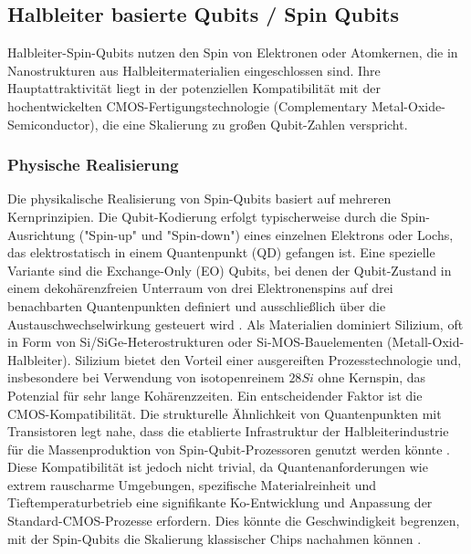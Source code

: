 \subsection{Halbleiter basierte Qubits / Spin Qubits}
Halbleiter-Spin-Qubits nutzen den Spin von Elektronen oder Atomkernen, die in Nanostrukturen aus Halbleitermaterialien eingeschlossen sind. Ihre Hauptattraktivität liegt in der potenziellen Kompatibilität mit der hochentwickelten CMOS-Fertigungstechnologie (Complementary Metal-Oxide-Semiconductor), die eine Skalierung zu großen Qubit-Zahlen verspricht.

\subsubsection{Physische Realisierung}
Die physikalische Realisierung von Spin-Qubits basiert auf mehreren Kernprinzipien. Die Qubit-Kodierung erfolgt typischerweise durch die Spin-Ausrichtung ("Spin-up" und "Spin-down") eines einzelnen Elektrons oder Lochs, das elektrostatisch in einem Quantenpunkt (QD) gefangen ist. Eine spezielle Variante sind die Exchange-Only (EO) Qubits, bei denen der Qubit-Zustand in einem dekohärenzfreien Unterraum von drei Elektronenspins auf drei benachbarten Quantenpunkten definiert und ausschließlich über die Austauschwechselwirkung gesteuert wird \cite{chadwickShortTwoqubitPulse2025}. Als
Materialien dominiert Silizium, oft in Form von Si/SiGe-Heterostrukturen oder Si-MOS-Bauelementen (Metall-Oxid-Halbleiter). Silizium bietet den Vorteil einer ausgereiften Prozesstechnologie und, insbesondere bei Verwendung von isotopenreinem $28Si$ ohne Kernspin, das Potenzial für sehr lange Kohärenzzeiten. Ein entscheidender Faktor ist die
CMOS-Kompatibilität. Die strukturelle Ähnlichkeit von Quantenpunkten mit Transistoren legt nahe, dass die etablierte Infrastruktur der Halbleiterindustrie für die Massenproduktion von Spin-Qubit-Prozessoren genutzt werden könnte \cite{stuyckCMOSCompatibilitySemiconductor2024}. Diese Kompatibilität ist jedoch nicht trivial, da Quantenanforderungen wie extrem rauscharme Umgebungen, spezifische Materialreinheit und Tieftemperaturbetrieb eine signifikante Ko-Entwicklung und Anpassung der Standard-CMOS-Prozesse erfordern. Dies könnte die Geschwindigkeit begrenzen, mit der Spin-Qubits die Skalierung klassischer Chips nachahmen können \cite{chadwickShortTwoqubitPulse2025}.

